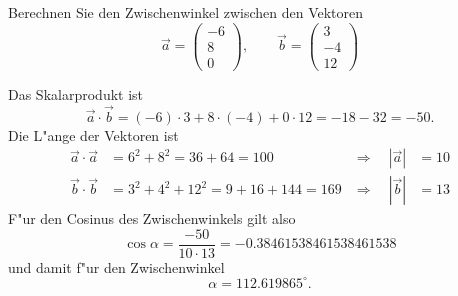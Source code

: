 Berechnen Sie den Zwischenwinkel zwischen den Vektoren
\[
\vec a
=
\begin{pmatrix}-6\\8\\0\end{pmatrix}
,\qquad
\vec b
=
\begin{pmatrix}3\\-4\\12\end{pmatrix}
\]

\begin{loesung}
Das Skalarprodukt ist
\[
\vec a\cdot\vec b=(-6)\cdot 3+8\cdot(-4)+0\cdot 12=-18-32=-50.
\]
Die L"ange der Vektoren ist
\begin{align*}
\vec a\cdot\vec a&=6^2+8^2=36+64=100&\Rightarrow\quad|\vec a|&=10\\
\vec b\cdot\vec b&=3^2+4^2+12^2=9+16+144=169&\Rightarrow\quad|\vec b|&=13
\end{align*}
F"ur den Cosinus des Zwischenwinkels gilt also
\[
\cos \alpha=\frac{-50}{10\cdot 13}=-0.38461538461538461538
\]
und damit f"ur den Zwischenwinkel
\[
\alpha=112.619865^\circ.
\]
\end{loesung}


